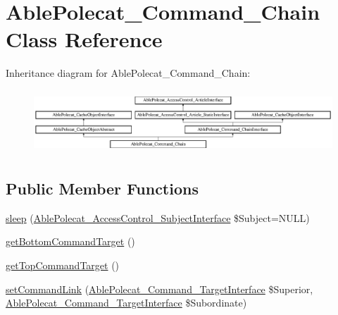 \hypertarget{class_able_polecat___command___chain}{}\section{Able\+Polecat\+\_\+\+Command\+\_\+\+Chain Class Reference}
\label{class_able_polecat___command___chain}
Inheritance diagram for Able\+Polecat\+\_\+\+Command\+\_\+\+Chain\+:\begin{figure}[H]
\begin{center}
\leavevmode
\includegraphics[height=2.408602cm]{class_able_polecat___command___chain}
\end{center}
\end{figure}
\subsection*{Public Member Functions}
\begin{DoxyCompactItemize}
\item 
\hyperlink{class_able_polecat___command___chain_a365e24d7b066205cafa2a5cce3a4f224}{sleep} (\hyperlink{interface_able_polecat___access_control___subject_interface}{Able\+Polecat\+\_\+\+Access\+Control\+\_\+\+Subject\+Interface} \$Subject=N\+U\+L\+L)
\item 
\hyperlink{class_able_polecat___command___chain_af7a918af43e7bf03f9b815c0d9cb4ff4}{get\+Bottom\+Command\+Target} ()
\item 
\hyperlink{class_able_polecat___command___chain_ae62d6679a43700f22fda4d1613a3c2ce}{get\+Top\+Command\+Target} ()
\item 
\hyperlink{class_able_polecat___command___chain_acb3b9b68b805ffd1619966a5ed7c0a39}{set\+Command\+Link} (\hyperlink{interface_able_polecat___command___target_interface}{Able\+Polecat\+\_\+\+Command\+\_\+\+Target\+Interface} \$Superior, \hyperlink{interface_able_polecat___command___target_interface}{Able\+Polecat\+\_\+\+Command\+\_\+\+Target\+Interface} \$Subordinate)
\end{DoxyCompactItemize}
